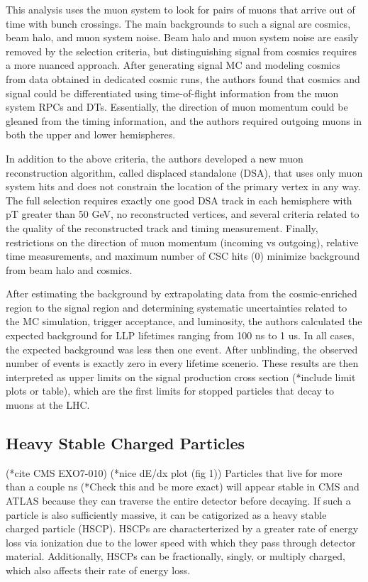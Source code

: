 \documentclass[12pt]{article}
\begin{document}
            This analysis uses the muon system to look for pairs of muons that arrive out of time with bunch crossings. The main backgrounds to such a signal are cosmics, beam halo, and muon system noise. Beam halo and muon system noise are easily removed by the selection criteria, but distinguishing signal from cosmics requires a more nuanced approach. After generating signal MC and modeling cosmics from data obtained in dedicated cosmic runs, the authors found that cosmics and signal could be differentiated using time-of-flight information from the muon system RPCs and DTs. Essentially, the direction of muon momentum could be gleaned from the timing information, and the authors required outgoing muons in both the upper and lower hemispheres.
            
            In addition to the above criteria, the authors developed a new muon reconstruction algorithm, called displaced standalone (DSA), that uses only muon system hits and does not constrain the location of the primary vertex in any way. The full selection requires exactly one good DSA track in each hemisphere with pT greater than 50 GeV, no reconstructed vertices, and several criteria related to the quality of the reconstructed track and timing measurement. Finally, restrictions on the direction of muon momentum (incoming vs outgoing), relative time measurements, and maximum number of CSC hits (0) minimize background from beam halo and cosmics.

            After estimating the background by extrapolating data from the cosmic-enriched region to the signal region and determining systematic uncertainties related to the MC simulation, trigger acceptance, and luminosity, the authors calculated the expected background for LLP lifetimes ranging from 100 ns to 1 us. In all cases, the expected background was less then one event. After unblinding, the observed number of events is exactly zero in every lifetime scenerio. These results are then interpreted as upper limits on the signal production cross section (*include limit plots or table), which are the first limits for stopped particles that decay to muons at the LHC.

\subsection{Heavy Stable Charged Particles}
            (*cite CMS EXO7-010)
            (*nice dE/dx plot (fig 1))
            Particles that live for more than a couple ns (*Check this and be more exact) will appear stable in CMS and ATLAS because they can traverse the entire detector before decaying. If such a particle is also sufficiently massive, it can be catigorized as a heavy stable charged particle (HSCP). HSCPs are characterterized by a greater rate of energy loss via ionization due to the lower speed with which they pass through detector material. Additionally, HSCPs can be fractionally, singly, or multiply charged, which also affects their rate of energy loss. 
\end{document}
